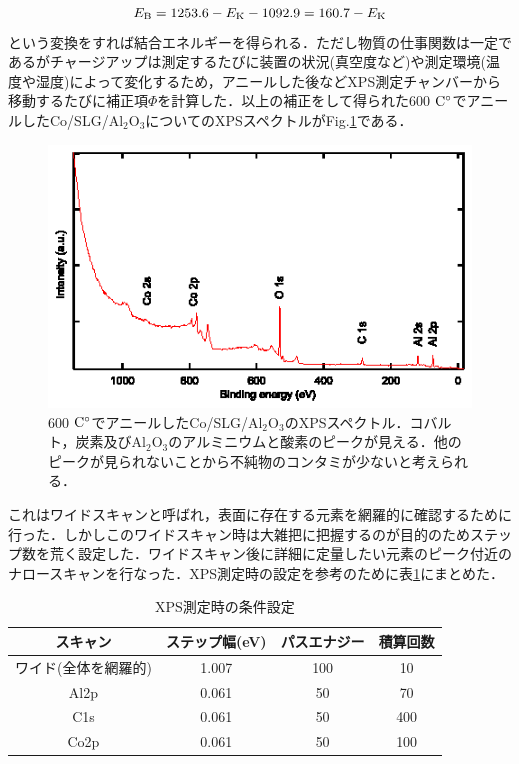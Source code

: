 {\begin{eqnarray}
E_{\rm B} = 1253.6 - E_{\rm K} -1092.9 = 160.7 -E_{\rm K}
\label{eq:XPS3}
\end{eqnarray}
という変換をすれば結合エネルギーを得られる．ただし物質の仕事関数は一定であるがチャージアップは測定するたびに装置の状況(真空度など)や測定環境(温度や湿度)によって変化するため，アニールした後などXPS測定チャンバーから移動するたびに補正項$\Phi$を計算した．以上の補正をして得られた600$\rm\ C^{\circ}$でアニールしたCo/SLG/Al$_{2}$O$_{3}$についてのXPSスペクトルがFig.\ref{fig:600aneal_1st_0deg}である．
\begin{figure}[htbp]
\centerline{
\includegraphics[width=12cm]{images/600aneal_1st_0deg.eps}
}
\caption{600$\rm\ C^{\circ}$でアニールしたCo/SLG/Al$_{2}$O$_{3}$のXPSスペクトル．コバルト，炭素及びAl$_{2}$O$_{3}$のアルミニウムと酸素のピークが見える．他のピークが見られないことから不純物のコンタミが少ないと考えられる．
}
\label{fig:600aneal_1st_0deg} 
\end{figure}

これはワイドスキャンと呼ばれ，表面に存在する元素を網羅的に確認するために行った．しかしこのワイドスキャン時は大雑把に把握するのが目的のためステップ数を荒く設定した．ワイドスキャン後に詳細に定量したい元素のピーク付近のナロースキャンを行なった．XPS測定時の設定を参考のために表\ref{tb:XPScondition}にまとめた．
\begin{table}[htbp]
 \caption{XPS測定時の条件設定}
 \begin{center}
  \begin{tabular}{cccc}\toprule
  	スキャン	&	ステップ幅(eV)	&	パスエナジー		&	積算回数	\\	\hline
	ワイド(全体を網羅的)	&	1.007		&	100	&	10				\\
	Al2p&	0.061		&	50		&	70
	\\
	C1s&  0.061  &    50  & 400
	\\
	Co2p& 0.061  &   50   &   100
						\\	\bottomrule
  \end{tabular}
 \end{center}
 \label{tb:XPScondition}
\end{table}

}
